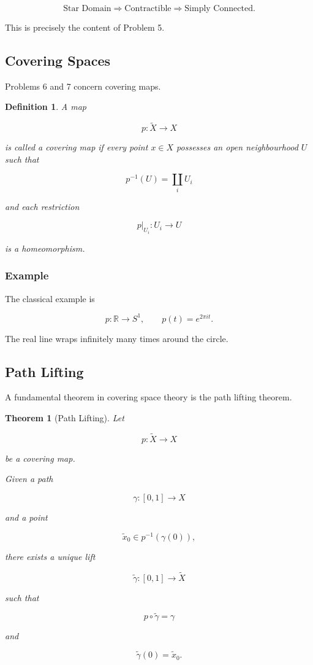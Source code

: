 \documentclass[12pt,a4paper]{article}
\newtheorem{theorem}{Theorem}[section]
\theoremstyle{notespace}
\newtheorem{definition}{Definition}[subsection]
\begin{document}
\[
\boxed{
	\text{Star Domain}
	\Longrightarrow
	\text{Contractible}
	\Longrightarrow
	\text{Simply Connected}.
}
\]

This is precisely the content of Problem 5.

\subsection{Covering Spaces}

Problems 6 and 7 concern covering maps.

\begin{definition}
	A map
	
	\[
	p:\widetilde X\to X
	\]
	
	is called a \emph{covering map} if every point \(x\in X\) possesses an open neighbourhood \(U\) such that
	
	\[
	p^{-1}(U)
	=
	\coprod_i U_i
	\]
	
	and each restriction
	
	\[
	p|_{U_i}:U_i\to U
	\]
	
	is a homeomorphism.
\end{definition}

\subsubsection*{Example}

The classical example is

\[
p:\mathbb R\to S^1,
\qquad
p(t)=e^{2\pi i t}.
\]

The real line wraps infinitely many times around the circle.

\subsection{Path Lifting}

A fundamental theorem in covering space theory is the path lifting theorem.

\begin{theorem}[Path Lifting]
	Let
	
	\[
	p:\widetilde X\to X
	\]
	
	be a covering map.
	
	Given a path
	
	\[
	\gamma:[0,1]\to X
	\]
	
	and a point
	
	\[
	\widetilde x_0\in p^{-1}(\gamma(0)),
	\]
	
	there exists a unique lift
	
	\[
	\widetilde\gamma:[0,1]\to\widetilde X
	\]
	
	such that
	
	\[
	p\circ\widetilde\gamma=\gamma
	\]
	
	and
	
	\[
	\widetilde\gamma(0)=\widetilde x_0.
	\]
\end{theorem}
\end{document}
